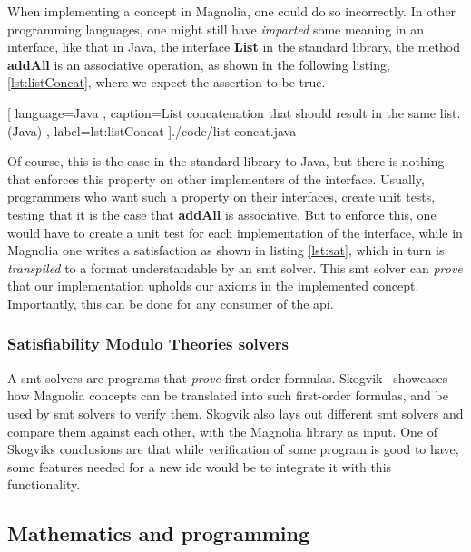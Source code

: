 When implementing a concept in Magnolia, one could do so incorrectly. In other
programming languages, one might still have \textit{imparted} some meaning in an
interface, like that in Java, the interface \textbf{List} in the standard
library, the method \textbf{addAll} is an associative operation, as shown in
the following listing, \ref{lst:listConcat}, where we expect the assertion to be
true.

\begin{code}
  
    [ language=Java
    , caption={List concatenation that should result in the same list. (Java)}
    , label=lst:listConcat
    ]{./code/list-concat.java}
\end{code}

Of course, this is the case in the standard library to Java, but there is
nothing that enforces this property on other implementers of the interface.
Usually, programmers who want such a property on their interfaces, create unit
tests, testing that it is the case that \textbf{addAll} is associative. But to
enforce this, one would have to create a unit test for each implementation of
the interface, while in Magnolia one writes a satisfaction as shown in listing
\ref{lst:sat}, which in turn is \textit{transpiled} to a format understandable
by an \gls*{smt} solver. This \gls*{smt} solver can \textit{prove} that our
implementation upholds our axioms in the implemented concept. Importantly, this
can be done for any consumer of the \gls*{api}.


\subsubsection{Satisfiability Modulo Theories solvers}

A \gls*{smt} solvers are programs that \textit{prove} first-order formulas.
Skogvik~\cite{beateVerification} showcases how Magnolia concepts can be
translated into such first-order formulas, and be used by \gls*{smt} solvers to
verify them. Skogvik also lays out different \gls*{smt} solvers and compare them
against each other, with the Magnolia library as input. One of Skogviks
conclusions are that while verification of some program is good to have, some
features needed for a new \gls*{ide} would be to integrate it with this
functionality.


\subsection{Mathematics and programming}

